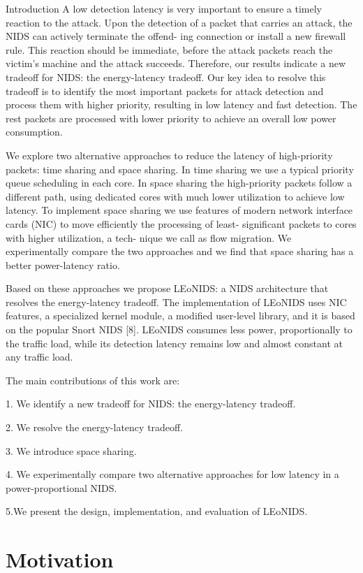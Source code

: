 \documentclass{beamer}
\begin{document}
\begin{frame}[allowframebreaks]{Introduction}
A low detection latency is very important to ensure a timely
reaction to the attack. Upon the detection of a packet that
carries an attack, the NIDS can actively terminate the offend-
ing connection or install a new firewall rule. This reaction
should be immediate, before the attack packets reach the
victim's machine and the attack succeeds. Therefore, our
results indicate a new tradeoff for NIDS: the energy-latency
tradeoff. Our key idea to resolve this tradeoff is to identify
the most important packets for attack detection and process
them with higher priority, resulting in low latency and fast
detection. The rest packets are processed with lower priority
to achieve an overall low power consumption.

We explore two alternative approaches to reduce the
latency of high-priority packets: time sharing and space
sharing. In time sharing we use a typical priority queue
scheduling in each core. In space sharing the high-priority
packets follow a different path, using dedicated cores with
much lower utilization to achieve low latency. To implement
space sharing we use features of modern network interface
cards (NIC) to move efficiently the processing of least-
significant packets to cores with higher utilization, a tech-
nique we call as flow migration. We experimentally compare
the two approaches and we find that space sharing has a better
power-latency ratio.

Based on these approaches we propose LEoNIDS: a NIDS
architecture that resolves the energy-latency tradeoff. The
implementation of LEoNIDS uses NIC features, a specialized
kernel module, a modified user-level library, and it is based on
the popular Snort NIDS [8]. LEoNIDS consumes less power,
proportionally to the traffic load, while its detection latency
remains low and almost constant at any traffic load.

The main contributions of this work are:

1. We identify a new tradeoff for NIDS: the energy-latency
tradeoff.

2. We resolve the energy-latency tradeoff.

3. We introduce space sharing.

4. We experimentally compare two alternative approaches for low latency in a power-proportional NIDS.

5.We present the design, implementation, and evaluation
of LEoNIDS.
\end{frame}

\section{Motivation}
\end{document}
